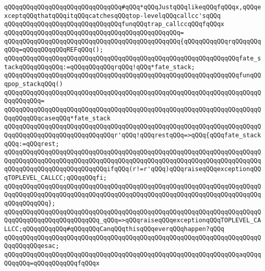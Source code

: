 \verb|qQQqqQQqqQQqqQQqqQQqqQQqqQQqqQQq#qQQq*qQQqJustqQQqlikeqQQqfqQQqx,qQQqexceptqQQqthatqQQqitqQQqcatchesqQQqtop-levelqQQqcallcc'sqQQq|\newline
\newline
\verb|qQQqqQQqqQQqqQQqqQQqqQQqqQQqqQQqfunqQQqtrap_callccqQQqfqQQqx|\newline
\verb|qQQqqQQqqQQqqQQqqQQqqQQqqQQqqQQqqQQqqQQqqQQqqQQq=|\newline
\verb|qQQqqQQqqQQqqQQqqQQqqQQqqQQqqQQqqQQqqQQqqQQqqQQq{qQQqqQQqqQQqrqQQqqQQqqQQq=qQQqqQQqqQQqREFqQQq();|\newline
\newline
\verb|qQQqqQQqqQQqqQQqqQQqqQQqqQQqqQQqqQQqqQQqqQQqqQQqqQQqqQQqqQQqqQQqfate_stackqQQqqQQqqQQq:=qQQqqQQqqQQqrqQQq!qQQq*fate_stack;|\newline
\newline
\verb|qQQqqQQqqQQqqQQqqQQqqQQqqQQqqQQqqQQqqQQqqQQqqQQqqQQqqQQqqQQqqQQqfunqQQqpop_stackqQQq()|\newline
\verb|qQQqqQQqqQQqqQQqqQQqqQQqqQQqqQQqqQQqqQQqqQQqqQQqqQQqqQQqqQQqqQQqqQQqqQQqqQQqqQQq=|\newline
\verb|qQQqqQQqqQQqqQQqqQQqqQQqqQQqqQQqqQQqqQQqqQQqqQQqqQQqqQQqqQQqqQQqqQQqqQQqqQQqqQQqcaseqQQq*fate_stack|\newline
\newline
\verb|qQQqqQQqqQQqqQQqqQQqqQQqqQQqqQQqqQQqqQQqqQQqqQQqqQQqqQQqqQQqqQQqqQQqqQQqqQQqqQQqqQQqqQQqqQQqqQQqqQQqr'qQQq!qQQqrestqQQq=>qQQq{qQQqfate_stackqQQq:=qQQqrest;|\newline
\verb|qQQqqQQqqQQqqQQqqQQqqQQqqQQqqQQqqQQqqQQqqQQqqQQqqQQqqQQqqQQqqQQqqQQqqQQqqQQqqQQqqQQqqQQqqQQqqQQqqQQqqQQqqQQqqQQqqQQqqQQqqQQqqQQqqQQqqQQqqQQqqQQqqQQqqQQqqQQqqQQqqQQqqQQqifqQQq(r!=r'qQQq)qQQqraiseqQQqexceptionqQQqTOPLEVEL_CALLCC;qQQqqQQqfi;|\newline
\verb|qQQqqQQqqQQqqQQqqQQqqQQqqQQqqQQqqQQqqQQqqQQqqQQqqQQqqQQqqQQqqQQqqQQqqQQqqQQqqQQqqQQqqQQqqQQqqQQqqQQqqQQqqQQqqQQqqQQqqQQqqQQqqQQqqQQqqQQqqQQqqQQqqQQqqQQq};|\newline
\verb|qQQqqQQqqQQqqQQqqQQqqQQqqQQqqQQqqQQqqQQqqQQqqQQqqQQqqQQqqQQqqQQqqQQqqQQqqQQqqQQqqQQqqQQqqQQqqQQq_qQQq=>qQQqraiseqQQqexceptionqQQqTOPLEVEL_CALLCC;qQQqqQQqqQQq#qQQqqQQqCanqQQqthisqQQqeverqQQqhappen?qQQq|\newline
\verb|qQQqqQQqqQQqqQQqqQQqqQQqqQQqqQQqqQQqqQQqqQQqqQQqqQQqqQQqqQQqqQQqqQQqqQQqqQQqqQQqesac;|\newline
\newline
\verb|qQQqqQQqqQQqqQQqqQQqqQQqqQQqqQQqqQQqqQQqqQQqqQQqqQQqqQQqqQQqqQQqaqQQqqQQqqQQq=qQQqqQQqqQQqfqQQqx|\newline
